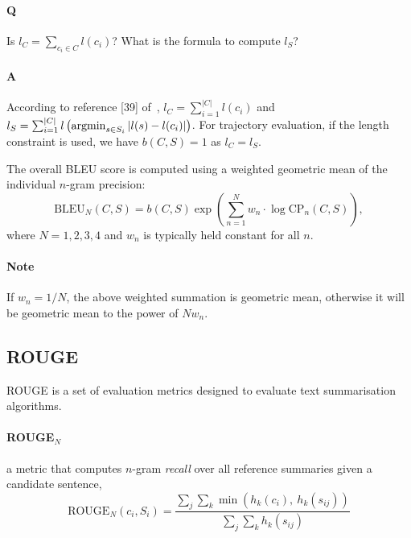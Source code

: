{\it
\paragraph{Q}
Is $l_C = \sum_{c_i \in C} l(c_i)$?
What is the formula to compute $l_S$? 

\paragraph{A}
According to reference [39] of~\cite{chen2015microsoft}, $l_C = \sum_{i=1}^{| C |} l(c_i)$ and 
$l_S = \sum_{i=1}^{| C |} l\left( \operatorname*{argmin}_{s \in S_i} | l(s) - l(c_i) | \right)$.
For trajectory evaluation, if the length constraint is used, we have $b(C, S) = 1$ as $l_C = l_S$. \\
}

\noindent 
The overall BLEU score is computed using a weighted geometric mean of the individual $n$-gram precision:
\begin{equation*}
\text{BLEU}_N(C, S) = b(C, S) \exp\left( \sum_{n=1}^N w_n \cdot \log \text{CP}_n(C, S) \right),
\end{equation*}
where $N=1,2,3,4$ and $w_n$ is typically held constant for all $n$.

{\it
\paragraph{Note}
If $w_n = 1/N$, the above weighted summation is geometric mean, otherwise it will be geometric mean to the power of $N w_n$.
}


\subsection{ROUGE}
ROUGE is a set of evaluation metrics designed to evaluate text summarisation algorithms.

\paragraph{ROUGE$_N$} a metric that computes $n$-gram \emph{recall} over all reference summaries given a candidate sentence,
\begin{equation*}
\text{ROUGE}_N (c_i, S_i) = \frac{\sum_j \sum_k \min\left( h_k(c_i),~ h_k(s_{ij}) \right)} {\sum_j \sum_k h_k(s_{ij})}
\end{equation*}

